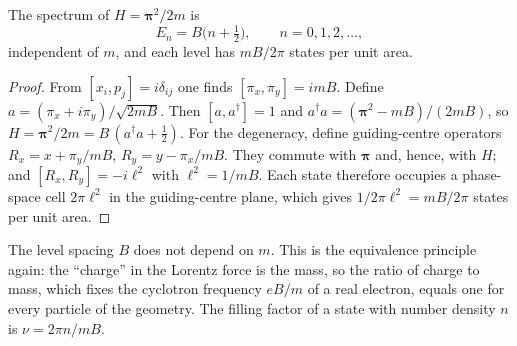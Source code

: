 \begin{nrprop}\label{nr:prop-landau}
The spectrum of $H=\boldsymbol{\pi}^2/2m$ is
\begin{equation}
  E_n=B\bigl(n+\tfrac12\bigr),\qquad n=0,1,2,\dots,
  \label{nr:landau}
\end{equation}
independent of $m$, and each level has $mB/2\pi$ states per unit area.
\end{nrprop}
\begin{proof}
From $[x_i,p_j]=i\delta_{ij}$ one finds $[\pi_x,\pi_y]=imB$. Define
$a=(\pi_x+i\pi_y)/\sqrt{2mB}$. Then $[a,a^\dagger]=1$ and
$a^\dagger a=(\boldsymbol\pi^2-mB)/(2mB)$, so
$H=\boldsymbol\pi^2/2m=B\,(a^\dagger a+\tfrac12)$.
For the degeneracy, define guiding-centre operators
$R_x=x+\pi_y/mB$, $R_y=y-\pi_x/mB$. They commute with $\boldsymbol\pi$
and, hence, with $H$; and $[R_x,R_y]=-i\ell^2$ with $\ell^2=1/mB$. Each state
therefore occupies a phase-space cell $2\pi\ell^2$ in the guiding-centre plane,
which gives $1/2\pi\ell^2=mB/2\pi$ states per unit area.
\end{proof}

The level spacing $B$ does not depend on $m$. This is the equivalence principle
again: the ``charge'' in the Lorentz force is the mass, so the ratio of charge
to mass, which fixes the cyclotron frequency $eB/m$ of a real electron,
equals one for every particle of the geometry. The filling factor of a state
with number density $n$ is $\nu=2\pi n/mB$.

